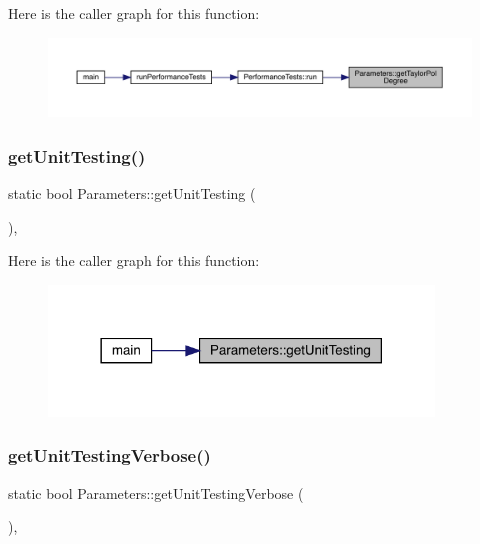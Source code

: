 Here is the caller graph for this function\+:
\nopagebreak
\begin{figure}[H]
\begin{center}
\leavevmode
\includegraphics[width=350pt]{class_parameters_a272f8ebfbd305fb4a3b03db68417fc90_icgraph}
\end{center}
\end{figure}
\mbox{\label{class_parameters_a785042104e5f47f11d625ec346853174}} 
\subsubsection{\texorpdfstring{getUnitTesting()}{getUnitTesting()}}
{\footnotesize\ttfamily static bool Parameters\+::get\+Unit\+Testing (\begin{DoxyParamCaption}{ }\end{DoxyParamCaption})\hspace{0.3cm}{\ttfamily [inline]}, {\ttfamily [static]}}

Here is the caller graph for this function\+:
\nopagebreak
\begin{figure}[H]
\begin{center}
\leavevmode
\includegraphics[width=290pt]{class_parameters_a785042104e5f47f11d625ec346853174_icgraph}
\end{center}
\end{figure}
\mbox{\label{class_parameters_a2645617063e170828a3da439094ab626}} 
\subsubsection{\texorpdfstring{getUnitTestingVerbose()}{getUnitTestingVerbose()}}
{\footnotesize\ttfamily static bool Parameters\+::get\+Unit\+Testing\+Verbose (\begin{DoxyParamCaption}{ }\end{DoxyParamCaption})\hspace{0.3cm}{\ttfamily [inline]}, {\ttfamily [static]}}


